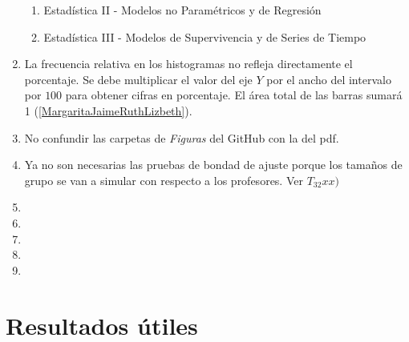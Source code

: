 \begin{enumerate}
\begin{enumerate}
  \item Estadística II - Modelos no Paramétricos y de Regresión
  
  \item Estadística III - Modelos de Supervivencia y de Series de Tiempo
  \end{enumerate}
  
  \item La frecuencia relativa en los histogramas no refleja directamente el porcentaje. Se debe multiplicar el valor del eje $Y$ por el ancho del intervalo por $100$ para obtener cifras en porcentaje. El área total de las barras sumará 1 (\ref{MargaritaJaimeRuthLizbeth}).
  
  \item No confundir las carpetas de \textit{Figuras} del GitHub con la del pdf.
  
  \item Ya no son necesarias las pruebas de bondad de ajuste porque los tamaños de grupo se van a simular con respecto a los profesores. Ver $T_{32} xx)$
  
  \item 
  
  \item 
  
  \item 
  
  \item 
  
  \item 
\end{enumerate}


\section{Resultados útiles} %

